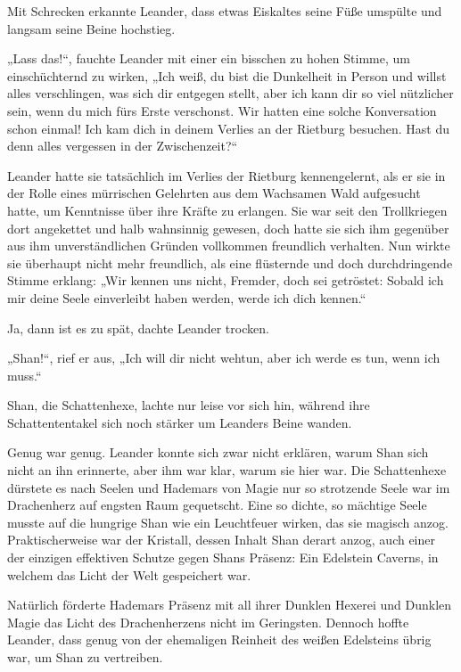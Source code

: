 \documentclass[10pt, a4paper, oneside]{book}
\begin{document}
Mit Schrecken erkannte Leander, dass etwas Eiskaltes seine Füße umspülte und langsam seine Beine hochstieg.

„Lass das!“, fauchte Leander mit einer ein bisschen zu hohen Stimme, um einschüchternd zu wirken, „Ich weiß, du bist die Dunkelheit in Person und willst alles verschlingen, was sich dir entgegen stellt, aber ich kann dir so viel nützlicher sein, wenn du mich fürs Erste verschonst. Wir hatten eine solche Konversation schon einmal! Ich kam dich in deinem Verlies an der Rietburg besuchen. Hast du denn alles vergessen in der Zwischenzeit?“

Leander hatte sie tatsächlich im Verlies der Rietburg kennengelernt, als er sie in der Rolle eines mürrischen Gelehrten aus dem Wachsamen Wald aufgesucht hatte, um Kenntnisse über ihre Kräfte zu erlangen. Sie war seit den Trollkriegen dort angekettet und halb wahnsinnig gewesen, doch hatte sie sich ihm gegenüber aus ihm unverständlichen Gründen vollkommen freundlich verhalten. Nun wirkte sie überhaupt nicht mehr freundlich, als eine flüsternde und doch durchdringende Stimme erklang: „Wir kennen uns nicht, Fremder, doch sei getröstet: Sobald ich mir deine Seele einverleibt haben werden, werde ich dich kennen.“

Ja, dann ist es zu spät, dachte Leander trocken.

„Shan!“, rief er aus, „Ich will dir nicht wehtun, aber ich werde es tun, wenn ich muss.“

Shan, die Schattenhexe, lachte nur leise vor sich hin, während ihre Schattententakel sich noch stärker um Leanders Beine wanden.

Genug war genug. Leander konnte sich zwar nicht erklären, warum Shan sich nicht an ihn erinnerte, aber ihm war klar, warum sie hier war. Die Schattenhexe dürstete es nach Seelen und Hademars von Magie nur so strotzende Seele war im Drachenherz auf engsten Raum gequetscht. Eine so dichte, so mächtige Seele musste auf die hungrige Shan wie ein Leuchtfeuer wirken, das sie magisch anzog. Praktischerweise war der Kristall, dessen Inhalt Shan derart anzog, auch einer der einzigen effektiven Schutze gegen Shans Präsenz: Ein Edelstein Caverns, in welchem das Licht der Welt gespeichert war.

Natürlich förderte Hademars Präsenz mit all ihrer Dunklen Hexerei und Dunklen Magie das Licht des Drachenherzens nicht im Geringsten. Dennoch hoffte Leander, dass genug von der ehemaligen Reinheit des weißen Edelsteins übrig war, um Shan zu vertreiben.
\end{document}
